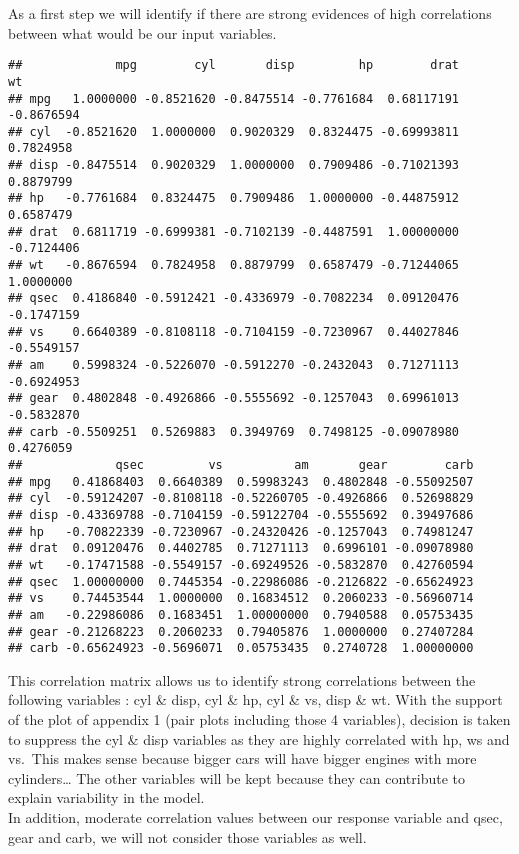 \documentclass[
]{article}
\newenvironment{Shaded}{\begin{snugshade}}{\end{snugshade}}
\newcommand{\KeywordTok}[1]{\textcolor[rgb]{0.13,0.29,0.53}{\textbf{#1}}}
\newcommand{\NormalTok}[1]{#1}
\newcommand{\OperatorTok}[1]{\textcolor[rgb]{0.81,0.36,0.00}{\textbf{#1}}}
\newcommand{\StringTok}[1]{\textcolor[rgb]{0.31,0.60,0.02}{#1}}
\begin{document}
As a first step we will identify if there are strong evidences of high
correlations between what would be our input variables.

\begin{Shaded}
\end{Shaded}

\begin{verbatim}
##             mpg        cyl       disp         hp        drat         wt
## mpg   1.0000000 -0.8521620 -0.8475514 -0.7761684  0.68117191 -0.8676594
## cyl  -0.8521620  1.0000000  0.9020329  0.8324475 -0.69993811  0.7824958
## disp -0.8475514  0.9020329  1.0000000  0.7909486 -0.71021393  0.8879799
## hp   -0.7761684  0.8324475  0.7909486  1.0000000 -0.44875912  0.6587479
## drat  0.6811719 -0.6999381 -0.7102139 -0.4487591  1.00000000 -0.7124406
## wt   -0.8676594  0.7824958  0.8879799  0.6587479 -0.71244065  1.0000000
## qsec  0.4186840 -0.5912421 -0.4336979 -0.7082234  0.09120476 -0.1747159
## vs    0.6640389 -0.8108118 -0.7104159 -0.7230967  0.44027846 -0.5549157
## am    0.5998324 -0.5226070 -0.5912270 -0.2432043  0.71271113 -0.6924953
## gear  0.4802848 -0.4926866 -0.5555692 -0.1257043  0.69961013 -0.5832870
## carb -0.5509251  0.5269883  0.3949769  0.7498125 -0.09078980  0.4276059
##             qsec         vs          am       gear        carb
## mpg   0.41868403  0.6640389  0.59983243  0.4802848 -0.55092507
## cyl  -0.59124207 -0.8108118 -0.52260705 -0.4926866  0.52698829
## disp -0.43369788 -0.7104159 -0.59122704 -0.5555692  0.39497686
## hp   -0.70822339 -0.7230967 -0.24320426 -0.1257043  0.74981247
## drat  0.09120476  0.4402785  0.71271113  0.6996101 -0.09078980
## wt   -0.17471588 -0.5549157 -0.69249526 -0.5832870  0.42760594
## qsec  1.00000000  0.7445354 -0.22986086 -0.2126822 -0.65624923
## vs    0.74453544  1.0000000  0.16834512  0.2060233 -0.56960714
## am   -0.22986086  0.1683451  1.00000000  0.7940588  0.05753435
## gear -0.21268223  0.2060233  0.79405876  1.0000000  0.27407284
## carb -0.65624923 -0.5696071  0.05753435  0.2740728  1.00000000
\end{verbatim}

This correlation matrix allows us to identify strong correlations
between the following variables : cyl \& disp, cyl \& hp, cyl \& vs,
disp \& wt. With the support of the plot of appendix 1 (pair plots
including those 4 variables), decision is taken to suppress the cyl \&
disp variables as they are highly correlated with hp, ws and vs.~This
makes sense because bigger cars will have bigger engines with more
cylinders\ldots{} The other variables will be kept because they can
contribute to explain variability in the model.\\
In addition, moderate correlation values between our response variable
and qsec, gear and carb, we will not consider those variables as well.\\
\end{document}

